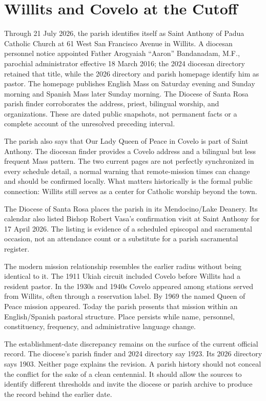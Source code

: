 \section{Willits and Covelo at the Cutoff}

Through 21 July 2026, the parish identifies itself as Saint Anthony of Padua Catholic Church at 61 West San Francisco Avenue in Willits. A diocesan personnel notice appointed Father Arogyaiah ``Aaron'' Bandanadam, M.F., parochial administrator effective 18 March 2016; the 2024 diocesan directory retained that title, while the 2026 directory and parish homepage identify him as pastor. The homepage publishes English Mass on Saturday evening and Sunday morning and Spanish Mass later Sunday morning. The Diocese of Santa Rosa parish finder corroborates the address, priest, bilingual worship, and organizations. These are dated public snapshots, not permanent facts or a complete account of the unresolved preceding interval.

The parish also says that Our Lady Queen of Peace in Covelo is part of Saint Anthony. The diocesan finder provides a Covelo address and a bilingual but less frequent Mass pattern. The two current pages are not perfectly synchronized in every schedule detail, a normal warning that remote-mission times can change and should be confirmed locally. What matters historically is the formal public connection: Willits still serves as a center for Catholic worship beyond the town.

The Diocese of Santa Rosa places the parish in its Mendocino/Lake Deanery. Its calendar also listed Bishop Robert Vasa's confirmation visit at Saint Anthony for 17 April 2026. The listing is evidence of a scheduled episcopal and sacramental occasion, not an attendance count or a substitute for a parish sacramental register.

The modern mission relationship resembles the earlier radius without being identical to it. The 1911 Ukiah circuit included Covelo before Willits had a resident pastor. In the 1930s and 1940s Covelo appeared among stations served from Willits, often through a reservation label. By 1969 the named Queen of Peace mission appeared. Today the parish presents that mission within an English/Spanish pastoral structure. Place persists while name, personnel, constituency, frequency, and administrative language change.

The establishment-date discrepancy remains on the surface of the current official record. The diocese's parish finder and 2024 directory say 1923. Its 2026 directory says 1903. Neither page explains the revision. A parish history should not conceal the conflict for the sake of a clean centennial. It should allow the sources to identify different thresholds and invite the diocese or parish archive to produce the record behind the earlier date.

